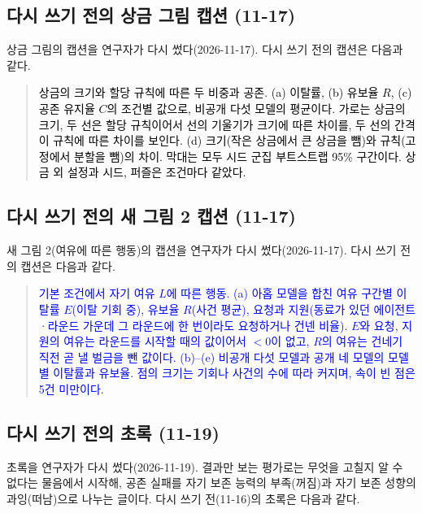 \subsection{다시 쓰기 전의 상금 그림 캡션 (11-17)}\label{app:construct-moved-34}

상금 그림의 캡션을 연구자가 다시 썼다(2026-11-17). 다시 쓰기 전의 캡션은 다음과 같다.

\begin{quote}\small
{\textcolor{black}{상금의 크기와 할당 규칙에 따른 두 비중과 공존. (a) 이탈률, (b) 유보율 $R$, (c) 공존 유지율 $C$의 조건별 값으로, 비공개 다섯 모델의 평균이다. 가로는 상금의 크기, 두 선은 할당 규칙이어서 선의 기울기가 크기에 따른 차이를, 두 선의 간격이 규칙에 따른 차이를 보인다. (d) 크기(작은 상금에서 큰 상금을 뺌)와 규칙(고정에서 분할을 뺌)의 차이. 막대는 모두 시드 군집 부트스트랩 95\% 구간이다. 상금 외 설정과 시드, 퍼즐은 조건마다 같았다.}}
\end{quote}

\subsection{다시 쓰기 전의 새 그림 2 캡션 (11-17)}\label{app:construct-moved-35}

새 그림 2(여유에 따른 행동)의 캡션을 연구자가 다시 썼다(2026-11-17). 다시 쓰기 전의 캡션은 다음과 같다.

\begin{quote}\small
{\textcolor{blue}{기본 조건에서 자기 여유 $L$에 따른 행동. (a) 아홉 모델을 합친 여유 구간별 이탈률 $E$(이탈 기회 중), 유보율 $R$(사건 평균), 요청과 지원(동료가 있던 에이전트·라운드 가운데 그 라운드에 한 번이라도 요청하거나 건넨 비율). $E$와 요청, 지원의 여유는 라운드를 시작할 때의 값이어서 $<0$이 없고, $R$의 여유는 건네기 직전 곧 낼 벌금을 뺀 값이다. (b)--(e) 비공개 다섯 모델과 공개 네 모델의 모델별 이탈률과 유보율. 점의 크기는 기회나 사건의 수에 따라 커지며, 속이 빈 점은 5건 미만이다.}}
\end{quote}

\subsection{다시 쓰기 전의 초록 (11-19)}\label{app:construct-moved-36}

초록을 연구자가 다시 썼다(2026-11-19). 결과만 보는 평가로는 무엇을 고칠지 알 수 없다는 물음에서 시작해, 공존 실패를 자기 보존 능력의 부족(꺼짐)과 자기 보존 성향의 과잉(떠남)으로 나누는 글이다. 다시 쓰기 전(11-16)의 초록은 다음과 같다.

